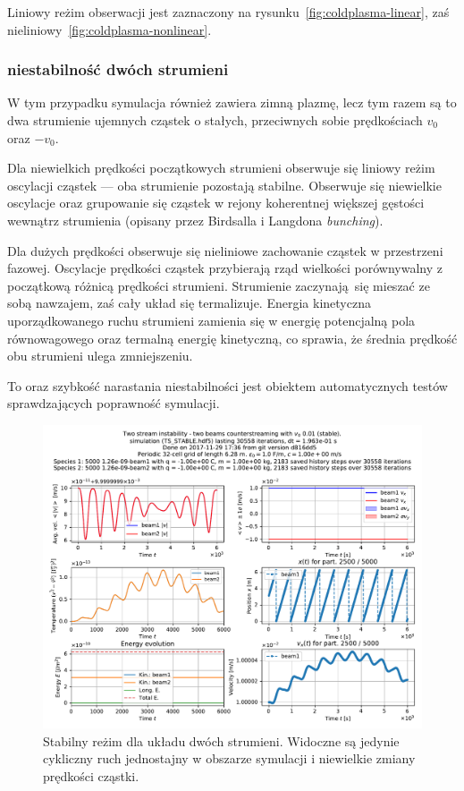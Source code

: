 Liniowy reżim obserwacji jest zaznaczony na rysunku~\ref{fig:coldplasma-linear}, zaś nieliniowy~\ref{fig:coldplasma-nonlinear}.

    \subsubsection{niestabilność dwóch strumieni}
W tym przypadku symulacja również zawiera zimną plazmę, lecz tym razem są to dwa strumienie ujemnych cząstek
o stałych, przeciwnych sobie prędkościach $v_0$ oraz $-v_0$.

    Dla niewielkich prędkości początkowych strumieni obserwuje się
    liniowy reżim oscylacji cząstek --- oba strumienie pozostają stabilne. Obserwuje się niewielkie oscylacje oraz
grupowanie się cząstek w rejony koherentnej większej gęstości wewnątrz strumienia (opisany przez Birdsalla i Langdona \emph{bunching}).

    Dla dużych prędkości obserwuje się nieliniowe
    zachowanie cząstek w przestrzeni fazowej. Oscylacje prędkości cząstek przybierają rząd wielkości porównywalny
    z początkową różnicą prędkości strumieni.
 Strumienie zaczynają się mieszać ze sobą nawzajem, zaś cały układ się termalizuje. Energia kinetyczna
 uporządkowanego ruchu strumieni zamienia się w energię potencjalną pola równowagowego 
oraz termalną energię kinetyczną, co sprawia, że średnia prędkość obu strumieni ulega zmniejszeniu. 

To oraz szybkość narastania niestabilności jest obiektem automatycznych testów sprawdzających poprawność symulacji.

\begin{figure}[h!]
  \includegraphics[width=\textwidth]{Images/TS_STABLE}
  \caption{Stabilny reżim dla układu dwóch strumieni. Widoczne są jedynie cykliczny ruch jednostajny w obszarze symulacji i niewielkie zmiany prędkości cząstki.\label{fig:twostream-stable}}
\end{figure}

